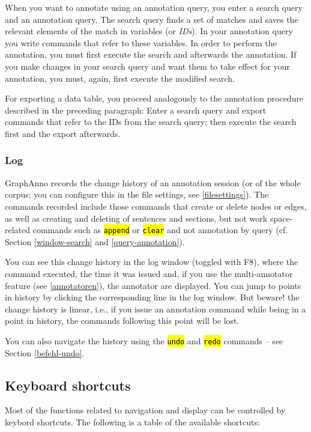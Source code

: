 \documentclass[12pt]{scrartcl}
\newcommand{\code}[1]{\hl{\texttt{#1}}}
\begin{document}
When you want to annotate using an annotation query, you enter a search query and an annotation query.
The search query finds a set of matches and saves the relevant elements of the match in variables (or \textit{IDs}).
In your annotation query you write commands that refer to these variables.
In order to perform the annotation, you must first execute the search and afterwards the annotation.
If you make changes in your search query and want them to take effect for your annotation, you must, again, first execute the modified search.

For exporting a data table, you proceed analogously to the annotation procedure described in the preceding paragraph:
Enter a search query and export commands that refer to the IDs from the search query; then execute the search first and the export afterwards.

\subsubsection{Log}\label{window-log}

GraphAnno records the change history of an annotation session (or of the whole corpus; you can configure this in the file settings, see \ref{filesettings}).
The commands recorded include those commands that create or delete nodes or edges, as well as creating and deleting of sentences and sections, but not work space-related commands such as \code{append} or \code{clear} and not annotation by query (cf. Section \ref{window-search} and \ref{query-annotation}).

You can see this change history in the log window (toggled with F8), where the command executed, the time it was issued and, if you use the multi-annotator feature (see \ref{annotatoren}), the annotator are displayed.
You can jump to points in history by clicking the corresponding line in the log window.
But beware! the change history is linear, i.e., if you issue an annotation command while being in a point in history, the commands following this point will be lost.

You can also navigate the history using the \code{undo} and \code{redo} commands – see Section \ref{befehl-undo}.


\subsection{Keyboard shortcuts}\label{shortcuts}

Most of the functions related to navigation and display can be controlled by keybord shortcuts.
The following is a table of the available shortcuts:
\end{document}
